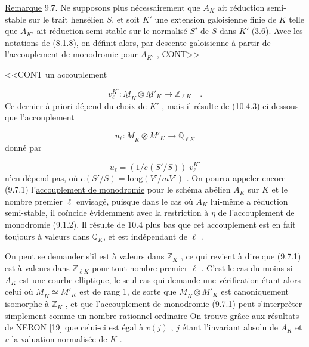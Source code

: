 \underline{Remarque} 9.7. Ne supposons plus nécessairement que $A_K$ ait réduction semi-stable sur le trait hensélien $S$, et soit $K'$ une extension galoisienne finie de $K$ telle que $A_{K'}$ ait réduction semi-stable sur le normalisé $S'$ de $S$ dans $K'$ (3.6). Avec les notations de (8.1.8), on définit alors, par descente galoisienne à partir de l'accouplement de monodromic pour $A_{K'}$ , CONT>>



<<CONT un accouplement

\begin{equation}\tag{*}
v_\ell^{K'} : \underline{M}_K \otimes \underline{M}'_K \longrightarrow \mathbb{Z}_{\ell K} \quad .
\end{equation}
Ce dernier à priori dépend du choix de $K'$ , mais il résulte de (10.4.3) ci-dessous que l'accouplement

\begin{equation}\tag{9.7.1}
u_\ell : \underline{M}_K \otimes \underline{M}'_K \longrightarrow \mathbb{Q}_{\ell K}
\end{equation}
donné par

\begin{equation*}
u_\ell = (1/e(S'/S))\; v_\ell^{K'}
\end{equation*}
n'en dépend pas, où $e(S'/S) = \mathrm{long}(V'/\underline{m}V')$ . On pourra appeler encore (9.7.1) l'\underline{accouplement de monodromie} pour le schéma abélien $A_K$ sur $K$ et le nombre premier $\ell$ envisagé, puisque dans le cas où $A_K$ lui-même a réduction semi-stable, il coïncide évidemment avec la restriction à $\eta$ de l'accouplement de monodromie (9.1.2). Il résulte de 10.4 plus bas que cet accouplement est en fait toujours à valeurs dans $\mathbb{Q}_K$, et est indépendant de $\ell$ .

On peut se demander s'il est à valeurs dans $\mathbb{Z}_K$ , ce qui revient à dire que (9.7.1) est à valeurs dans $\mathbb{Z}_{\ell K}$ pour tout nombre premier $\ell$ . C'est le cas du moins si $A_K$ est une courbe elliptique, le seul cas qui demande une vérification étant alors celui où $\underline{M}_K \simeq \underline{M}'_K$ est de rang 1, de sorte que $\underline{M}_K \otimes \underline{M}'_K$ est canoniquement isomorphe à $\mathbb{Z}_K$ , et que l'accouplement de monodromie (9.7.1) peut s'interprèter simplement comme un nombre rationnel ordinaire On trouve grâce aux résultats de NERON [19] que celui-ci est égal à $v(j)$ , $j$ étant l'invariant absolu de $A_K$ et $v$ la valuation normalisée de $K$ .


